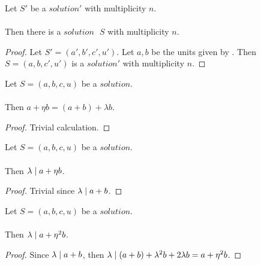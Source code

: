 \begin{lemma}
    \label{lmm:exists_Solution_of_Solution1}
    \leanok
    Let $S'$ be a $solution'$ with multiplicity $n$.\\\\
    Then there is a $solution\text{ }S$ with multiplicity $n$.
\end{lemma}
\begin{proof}
    \leanok
    Let $S'=(a',b',c',u')$. Let $a, b$ be the units given by .
    Then $S=(a,b,c',u')$ is a $solution'$ with multiplicity $n$.
\end{proof}

\begin{lemma}
    \label{lmm:a_add_eta_b}
    \leanok
    Let $S=(a, b, c, u)$ be a $solution$.\\\\
    Then $a + \eta  b = (a + b) + \lambda  b$.
\end{lemma}
\begin{proof}
    \leanok
    Trivial calculation.
\end{proof}

\begin{lemma}
    \label{lmm:lambda_dvd_a_add_eta_mul_b}
    \leanok
    Let $S=(a, b, c, u)$ be a $solution$.\\\\
    Then $\lambda \mid a + \eta  b$.
\end{lemma}
\begin{proof}
    \leanok
    Trivial since $\lambda \mid a+b$.
\end{proof}

\begin{lemma}
    \label{lmm:lambda_dvd_a_add_eta_sq_mul_b}
    \leanok
    Let $S=(a, b, c, u)$ be a $solution$.\\\\
    Then $\lambda \mid a + \eta^2  b$.
\end{lemma}
\begin{proof}
    \leanok
    Since $\lambda \mid a+b$, then
    $\lambda \mid (a + b) + \lambda^2  b + 2  \lambda  b
    = a + \eta^2  b$.
\end{proof}

